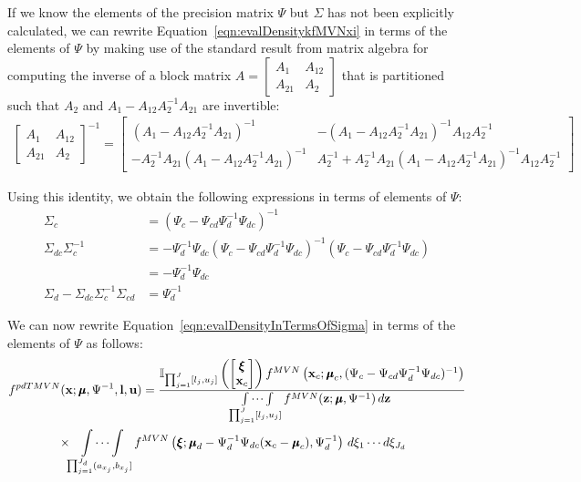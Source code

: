 \documentclass[fleqn]{article}\usepackage[]{graphicx}\usepackage[]{color}
\newcommand{\ind}{\mathbb{I}}
\begin{document}
If we know the elements of the precision matrix $\Psi$ but $\Sigma$ has not been explicitly calculated, we can rewrite Equation~\eqref{eqn:evalDensitykfMVNxi} in terms of the elements of $\Psi$ by making use of the standard result from matrix algebra for computing the inverse of a block matrix $A = \begin{bmatrix}
A_{1} & A_{12} \\
A_{21} & A_{2}
\end{bmatrix}$ that is partitioned such that $A_2$ and $A_1 - A_{12} A_{2}^{-1} A_{21}$ are invertible:
\begin{align*}
\begin{bmatrix}
A_{1} & A_{12} \\
A_{21} & A_{2}
\end{bmatrix}^{-1} = \begin{bmatrix}
(A_{1} - A_{12} A_2^{-1} A_{21})^{-1} & - (A_{1} - A_{12} A_2^{-1} A_{21})^{-1} A_{12} A_{2}^{-1} \\
- A_{2}^{-1} A_{21} (A_{1} - A_{12} A_2^{-1} A_{21})^{-1} & A_{2}^{-1} + A_{2}^{-1} A_{21} (A_{1} - A_{12} A_2^{-1} A_{21})^{-1} A_{12} A_{2}^{-1}
\end{bmatrix}
\end{align*}

Using this identity, we obtain the following expressions in terms of elements of $\Psi$:
\begin{align*}
\Sigma_c &= (\Psi_c - \Psi_{cd} \Psi_d^{-1} \Psi_{dc})^{-1} \\
\Sigma_{dc} \Sigma_c^{-1} &= - \Psi_d^{-1} \Psi_{dc} (\Psi_c - \Psi_{cd} \Psi_d^{-1} \Psi_{dc})^{-1} (\Psi_c - \Psi_{cd} \Psi_d^{-1} \Psi_{dc}) \\
&= - \Psi_d^{-1} \Psi_{dc} \\
\Sigma_d - \Sigma_{dc} \Sigma_c^{-1} \Sigma_{cd} &= \Psi_{d}^{-1}
\end{align*}

We can now rewrite Equation~\eqref{eqn:evalDensityInTermsOfSigma} in terms of the elements of $\Psi$ as follows:
\begin{align}
&f^{pdTMVN}(\bx ; \bmu, \Psi^{-1}, \bl, \bu) = \frac{\ind_{\prod_{j=1}^J [l_j, u_j]}\left(\begin{bmatrix} \bxi \\ \bx_c \end{bmatrix}\right) f^{MVN}\left(\bx_c; \bmu_c, (\Psi_c - \Psi_{cd} \Psi_d^{-1} \Psi_{dc})^{-1} \right)}{\idotsint\limits_{\prod_{j=1}^J [l_j, u_j]} f^{MVN}(\bz ; \bmu, \Psi^{-1}) \, d \bz } \nonumber \\
&\qquad \qquad \times \idotsint\limits_{\prod_{j=1}^{J_d} (a_{x_j}, b_{x_j}]} f^{MVN}\left(\bxi; \bmu_d - \Psi_d^{-1} \Psi_{dc}(\bx_c - \bmu_c), \Psi_d^{-1} \right) \, d \xi_1 \cdots d \xi_{J_d} \label{eqn:evalDensityInTermsOfSigma}
\end{align}
\end{document}
